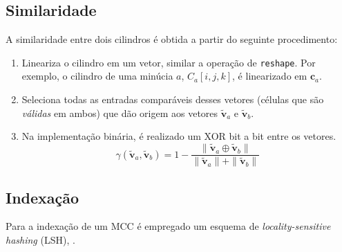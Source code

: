 \subsection{Similaridade}

A similaridade entre dois cilindros é obtida a partir do seguinte procedimento:
\begin{enumerate}
    \item Lineariza o cilindro em um vetor, similar a operação de \texttt{reshape}. Por exemplo, o cilindro de uma minúcia $a$, $C_a[i, j, k]$, é linearizado em $\mathbf{c}_a$.
    \item Seleciona todas as entradas comparáveis desses vetores (células que são \textit{válidas} em ambos) que dão origem aos vetores $\tilde{\mathbf{v}}_a$ e $\tilde{\mathbf{v}}_b$.
    \item Na implementação binária, é realizado um XOR bit a bit entre os vetores.
    \begin{equation}
        \gamma(\tilde{\mathbf{v}}_a, \tilde{\mathbf{v}}_b) =
            1 - \frac{\|\tilde{\mathbf{v}}_a \oplus \tilde{\mathbf{v}}_b\|}{\|\tilde{\mathbf{v}}_a\| + \|\tilde{\mathbf{v}}_b\|}
    \end{equation}
\end{enumerate}

\subsection{Indexação}

Para a indexação de um MCC é empregado um esquema de \textit{locality-sensitive hashing} (LSH), \cite{lsh:gionis1999,approximate:indyk1998}.

